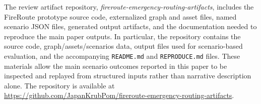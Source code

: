 The review artifact repository, \textit{fireroute-emergency-routing-artifacts}, includes the FireRoute prototype source code, externalized graph and asset files, named scenario JSON files, generated output artifacts, and the documentation needed to reproduce the main paper outputs. In particular, the repository contains the source code, graph/assets/scenarios data, output files used for scenario-based evaluation, and the accompanying \texttt{README.md} and \texttt{REPRODUCE.md} files. These materials allow the main scenario outcomes reported in this paper to be inspected and replayed from structured inputs rather than narrative description alone. The repository is available at \url{https://github.com/JapanKrubPom/fireroute-emergency-routing-artifacts}.